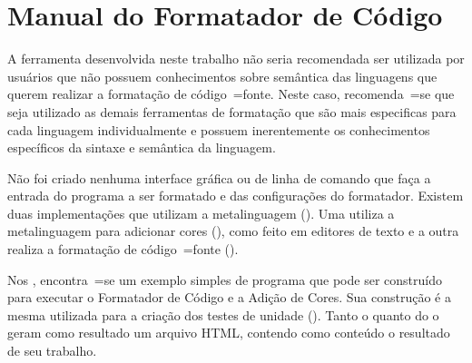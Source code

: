 

\chapter{Manual do Formatador de Código}
\label{manualDoFormatadorDeCodigo}

A ferramenta desenvolvida neste trabalho não seria recomendada ser utilizada por usuários que não possuem conhecimentos sobre semântica das linguagens que querem realizar a formatação de código~=fonte.
Neste caso,
recomenda~=se que seja utilizado as demais ferramentas de formatação que são mais especificas para cada linguagem individualmente e
possuem inerentemente os conhecimentos específicos da sintaxe e
semântica da linguagem.

Não foi criado nenhuma interface gráfica ou
de linha de comando que faça a entrada do programa a ser formatado e
das configurações do formatador.
Existem duas implementações que utilizam a metalinguagem ().
Uma utiliza a metalinguagem para adicionar cores (),
como feito em editores de texto e
a outra realiza a formatação de código~=fonte ().

Nos ,
encontra~=se um exemplo simples de programa que pode ser construído para executar o Formatador de Código e
a Adição de Cores.
Sua construção é a mesma utilizada para a criação dos testes de unidade ().
Tanto o  quanto do o  geram como resultado um arquivo HTML,
contendo como conteúdo o resultado de seu trabalho.

